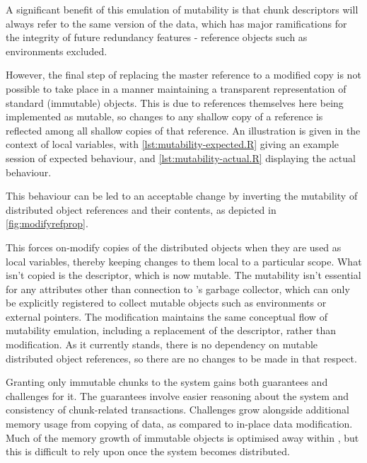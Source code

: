 
A significant benefit of this emulation of mutability is that chunk descriptors will always refer to the same version of the data, which has major ramifications for the integrity of future redundancy features - reference objects such as environments excluded.

However, the final step of replacing the master reference to a modified copy is not possible to take place in a manner maintaining a transparent representation of standard (immutable) \R{} objects.
This is due to references themselves here being implemented as mutable, so changes to any shallow copy of a reference is reflected among all shallow copies of that reference.
An illustration is given in the context of local variables, with \cref{lst:mutability-expected.R} giving an example \R{} session of expected behaviour, and \cref{lst:mutability-actual.R} displaying the actual behaviour.




This behaviour can be led to an acceptable change by inverting the mutability of distributed object references and their contents, as depicted in \cref{fig:modifyrefprop}.


This forces on-modify copies of the distributed objects when they are used as local variables, thereby keeping changes to them local to a particular scope.
What isn't copied is the descriptor, which is now mutable.
The mutability isn't essential for any attributes other than connection to \R{}'s garbage collector, which can only be explicitly registered to collect mutable objects such as environments or external pointers.
The modification maintains the same conceptual flow of mutability emulation, including a replacement of the descriptor, rather than modification.
As it currently stands, there is no \lsr{} dependency on mutable distributed object references, so there are no changes to be made in that respect.

Granting only immutable chunks to the \lsr{} system gains both guarantees and challenges for it.
The guarantees involve easier reasoning about the system and consistency of chunk-related transactions\cite{goetz2006java}.
Challenges grow alongside additional memory usage from copying of data, as compared to in-place data modification.
Much of the memory growth of immutable objects is optimised away within \R{}, but this is difficult to rely upon once the system becomes distributed\cite{rcore2020lang}.

